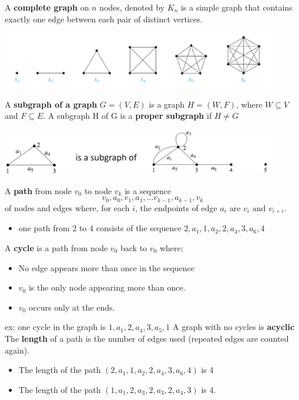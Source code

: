 \documentclass[12pt, letterpaper]{article}
\begin{document}
A \textbf{complete graph} on $n$ nodes, denoted by $K_n$ is a simple graph that contains exactly one edge between each pair of distinct vertices.
\begin{center}
	\includegraphics*[width=0.9\textwidth]{graphex3.png}	
\end{center}
\bigbreak

A \textbf{subgraph of a graph} $G = (V,E)$ is a graph $H = (W,F)$, where $W \subseteq V$ and $F \subseteq E$. A subgraph H of G is a \textbf{proper subgraph} if $H \ne G$
\begin{center}
	\includegraphics*[width=0.9\textwidth]{graphex4.png}	
\end{center}
\bigbreak
\begin{minipage}[t]{0.65\linewidth}
	A \textbf{path} from node $v_0$ to node $v_k$ is a sequence \[v_0, a_0, v_1, a_1, ... v_{k-1}, a_{k-1}, v_k\] of nodes and edges where, for each $i$, the endpoints of edge $a_i$ are $v_i$ and $v_{i+i}$.
	\begin{itemize}
		\item[\tiny ex] one path from 2 to 4 consists of the sequence $2, a_1, 1, a_2, 2, a_4, 3, a_6, 4$
	\end{itemize}
	\bigbreak
	A \textbf{cycle} is a path from node $v_0$ back to $v_0$ where;
	\begin{itemize}[leftmargin=*, label={}]
		\item No edge appears more than once in the sequence
		\item $v_0$ is the only node appearing more than once.
		\item $v_0$ occurs only at the ends.
	\end{itemize}
	{\tiny ex:} one cycle in the graph is $1, a_1, 2, a_4, 3, a_5, 1$\smallbreak
	A graph with no cycles is \textbf{acyclic}
	\bigbreak
	The \textbf{length} of a path is the number of edges used (repeated edges are counted again). 
	\begin{itemize}
		\item[\tiny ex] The length of the path $(2, a_1, 1, a_2, 2, a_4, 3, a_6, 4)$ is 4 
		\item[\tiny ex] The length of the path $(1, a_1, 2, a_3, 2, a_3, 2, a_4, 3)$ is 4.
	\end{itemize}
\end{minipage}
\end{document}

